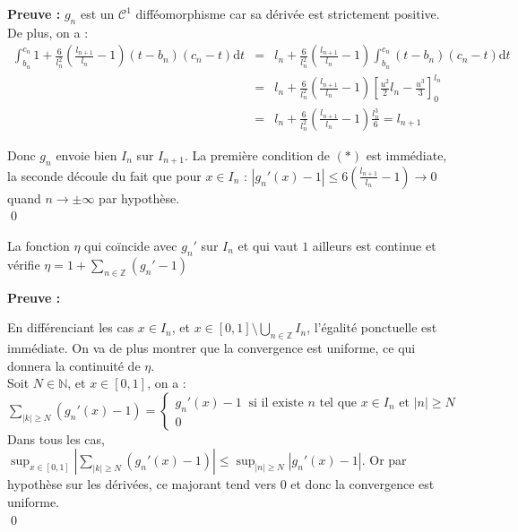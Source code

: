 \documentclass[11pt,a4paper]{article}
\begin{document}
\textbf{Preuve :} $g_n$ est un $\mathcal{C}^1$ difféomorphisme car sa dérivée est strictement positive. De plus, on a :
\begin{eqnarray*}
\int_{b_n}^{c_n} 1 + \frac{6}{l_n^2}(\frac{l_{n+1}}{l_n} -1)(t-b_n)(c_n-t)\mathrm{d}t &=& l_n +  \frac{6}{l_n^2}(\frac{l_{n+1}}{l_n} -1)\int_{b_n}^{c_n} (t-b_n)(c_n-t)\mathrm{d}t \\
&=& l_n +  \frac{6}{l_n^2}(\frac{l_{n+1}}{l_n} -1) \left [\frac{u^2}{2}l_n - \frac{u^3}{3}\right ]^{l_n}_0 \\
&=& l_n +  \frac{6}{l_n^2}(\frac{l_{n+1}}{l_n} -1) \frac{l_n^3}{6} = l_{n+1}
\end{eqnarray*}

Donc $g_n$ envoie bien $I_n$ sur $I_{n+1}$. La première condition de $(*)$ est immédiate, la seconde découle du fait que pour $x\in I_n$ : $ \displaystyle |g_n'(x) -1| \leq 6(\frac{l_{n+1}}{l_n} -1) \to 0 $ quand $n\to \pm \infty$ par hypothèse. \\ \qed
\begin{lemma}
La fonction $\eta$ qui coïncide avec $g_n'$ sur $I_n$ et qui vaut $1$ ailleurs est continue et vérifie $\displaystyle \eta =  1 + \sum_{n \in \mathbb{Z}} (g_n'-1)$
\end{lemma}

\textbf{Preuve :} 

%
%

En différenciant les cas $x \in I_n$, et $\displaystyle x\in [0,1] \setminus \bigcup_{n \in \mathbb{Z}} I_n$, l'égalité ponctuelle est immédiate. On va de plus montrer que la convergence est uniforme, ce qui donnera la continuité de $\eta$. \\ 
Soit $N \in \mathbb{N}$, et $x\in [0,1]$, on a : $\displaystyle \sum_{|k| \geq N} (g_n'(x)-1)= \begin{cases} g_n'(x)-1 \ \text{ si il existe } n \text{ tel que } x\in I_n \text{ et } |n|\geq N\\ 0 \end{cases}$ \\
Dans tous les cas, $\displaystyle \sup_{x\in [0,1]} \left | \sum_{|k| \geq N} (g_n'(x)-1) \right | \leq \sup_{|n| \geq N} |g_n'(x) -1|$. Or par hypothèse sur les dérivées, ce majorant tend vers $0$ et donc la convergence est uniforme. \\ \qed \\
\end{document}
